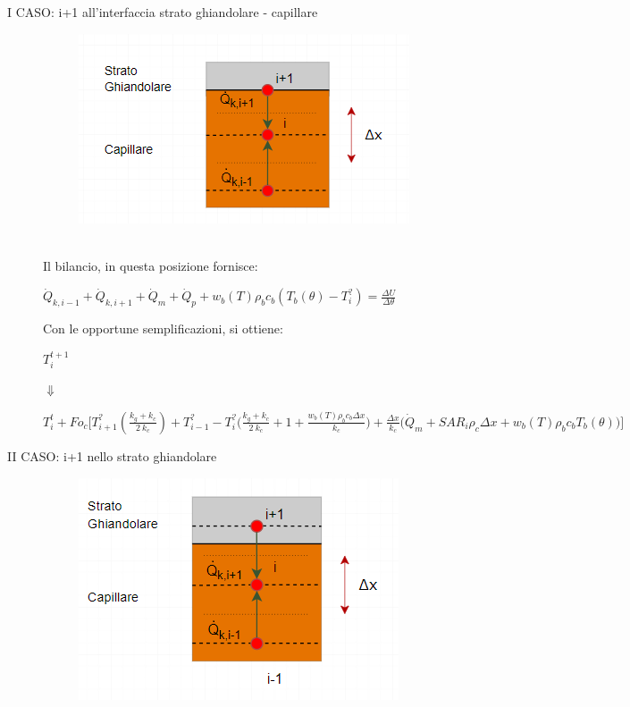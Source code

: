 \begin{description}
    \item[I CASO: i+1 all'interfaccia strato ghiandolare - capillare]
    \begin{figure}[H]
    \centering
    \includegraphics[width=.6\textwidth]{Immagini/Nodi/nodo20.1.png} 
    \label{nodo20.1}
\end{figure}
\noindent
\\Il bilancio, in questa posizione fornisce:
\begin{center}
	$ \Dot{Q} _{k, i-1} +\Dot{Q} _{k, i+1}+ \Dot{Q} _{m} +\Dot{Q} _{p}+ w_b (T) \rho _b c_b (T_b(\theta)-T_i ^?)= \frac{\Delta U}{\Delta \theta} $
\end{center}
Con le opportune semplificazioni, si ottiene:
\begin{center}
	$T_i ^{t+1} $
\end{center}
\begin{center}
	$\Downarrow$
\end{center}
\begin{center}
	$T_i ^t + Fo_{c} \Bigg[ T_{i+1} ^? (\frac{k_g+ k_{c}}{2 \: k_c}) + T_{i-1} ^?- T_i ^? \Big(\frac{k_g+ k_{c}}{2 \: k_c} + 1 + \frac{ w_b (T) \rho _b c_b \Delta x }{k_{c}} \Big) + \frac{\Delta x }{k_{c}} \Big(\Dot{Q} _{m} +  SAR_i \rho _{c} \Delta x + w_b (T) \rho _b c_b T_b(\theta)\Big) \Bigg]$
\end{center}


\item[II CASO: i+1 nello strato ghiandolare]

     \begin{figure}[H]
    \centering
    \includegraphics[width=.6\textwidth]{Immagini/Nodi/nodo20.2.png} 
    \label{nodo2}
\end{figure}
\end{description}
